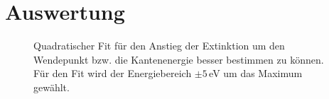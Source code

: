 \pagebreak
\section{Auswertung}\label{2.0}

\begin{figure}[H]
    \centering
%    
    \caption{Quadratischer Fit für den Anstieg der Extinktion um den Wendepunkt bzw. die Kantenenergie besser bestimmen zu können. Für den Fit wird der Energiebereich $\pm5\,$eV um das Maximum gewählt.}
    \label{fig:La2NiO4_kante}
\end{figure}
